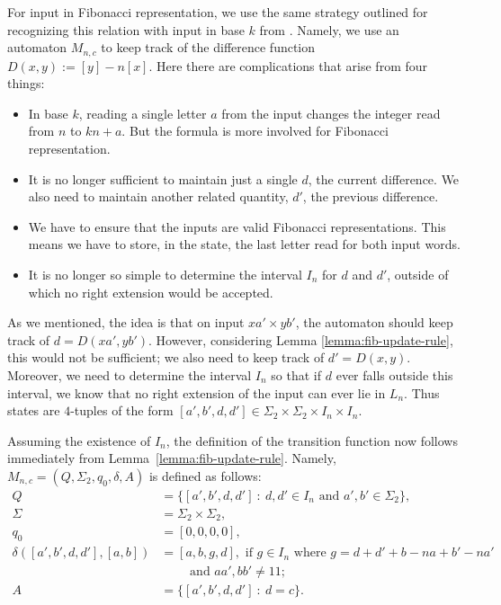 \documentclass[12pt,reqno]{article}
\def\suchthat{\ : \ }
\begin{document}
For input in Fibonacci representation, we use the same strategy outlined for recognizing this relation with input in base $k$ from \cite{moradi_complexity_2026}.  Namely, we use an automaton $M_{n,c}$ to keep track
of the difference 
function $D(x,y) := [y] - n [x]$. Here there are complications that arise from four things:
\begin{itemize}
\item In base $k$, reading a single letter $a$
from the input changes the integer read from $n$ to
$kn+a$.  But the formula is more involved for
Fibonacci representation.

\item It is no longer sufficient to maintain just a single
$d$, the current difference. We also need to maintain another related quantity,
$d'$, the previous difference.  

\item We have to ensure that the inputs are
valid Fibonacci representations.  This means we have
to store, in the state, the last letter read for both
input words.

\item It is no longer so simple to determine the interval $I_n$
for $d$ and $d'$, outside of which no right extension would be accepted.
\end{itemize}

As we mentioned,
the idea is that on input $xa' \times yb'$, the automaton should
keep track of $d = D (xa', yb')$.  However, considering Lemma \ref{lemma:fib-update-rule}, this would not be sufficient; we also need to keep track of $d' = D(x,y)$.
Moreover, we need to determine the interval $I_n$ so that if
$d$ ever falls outside this interval, we know that no right extension
of the input can ever lie in $L_n$.  Thus states are $4$-tuples
of the form $[a',b', d, d'] \in \Sigma_2 \times \Sigma_2 \times I_n \times I_n$.

Assuming the existence of $I_n$, the definition of the transition function now follows immediately from Lemma~\ref{lemma:fib-update-rule}.
Namely, 
$M_{n,c} = (Q, \Sigma_2, q_0, \delta, A)$ is defined as follows:
\begin{align*}
Q &= \{ [a',b',d,d'] \suchthat d, d' \in I_n \text{ and } a',b' \in \Sigma_2 \}, \\
\Sigma &=  \Sigma_2 \times \Sigma_2, \\
q_0 &= [0, 0, 0, 0], \\
\delta([a',b',d,d'],[a,b]) 
&=
    [a,b,g,d],  \text{ if $g \in I_n$ where $g = d + d' + b-na + b'-na'$}\\
    & \quad\quad \text{ and $aa', bb' \not= 11$};
     \\
A &= \{ [a', b', d, d'] \suchthat d = c \}.
\end{align*}
\end{document}
